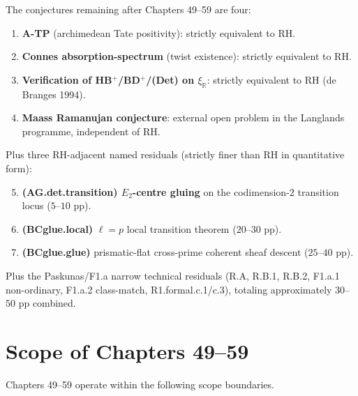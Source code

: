 The conjectures remaining after Chapters 49--59 are four:

\begin{enumerate}
\item \textbf{A-TP} (archimedean Tate positivity): strictly
equivalent to RH.
\item \textbf{Connes absorption-spectrum} (twist existence):
strictly equivalent to RH.
\item \textbf{Verification of HB\(^{+}\)/BD\(^{+}\)/(Det) on \(\xi_{\mathbb{R}}\)}:
strictly equivalent to RH (de Branges 1994).
\item \textbf{Maass Ramanujan conjecture}: external open problem
in the Langlands programme, independent of RH.
\end{enumerate}

Plus three RH-adjacent named residuals (strictly finer than RH in
quantitative form):

\begin{enumerate}
\setcounter{enumi}{4}
\item \textbf{(AG.det.transition) \(E_{2}\)-centre gluing} on the
codimension-\(2\) transition locus (\(5\)--\(10\) pp).
\item \textbf{(BCglue.local)} \(\ell=p\) local transition theorem
(\(20\)--\(30\) pp).
\item \textbf{(BCglue.glue)} prismatic-flat cross-prime coherent
sheaf descent (\(25\)--\(40\) pp).
\end{enumerate}

Plus the Paskunas/F1.a narrow technical residuals (R.A, R.B.1,
R.B.2, F1.a.1 non-ordinary, F1.a.2 class-match, R1.formal.c.1/c.3),
totaling approximately \(30\)--\(50\) pp combined.

\section{Scope of Chapters 49--59}
\label{v4-arith:w5-synth:does-not-do}

Chapters 49--59 operate within the following scope boundaries.

